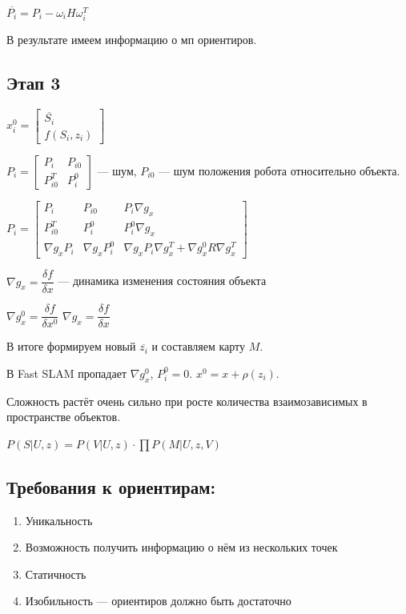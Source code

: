 \documentclass[12pt]{article}
\begin{document}
$\overline{P_i} = P_i - \omega_i H \omega_i^T$

В результате имеем информацию о мп ориентиров.

\subsection{Этап 3}

$x_i^0 = \begin{bmatrix} \overline{S_i} \\ f(S_i, z_i) \end{bmatrix}$

$P_i = \begin{bmatrix}P_i & P_{i0} \\ P_{i0}^T & P_i^0\end{bmatrix}$ — шум, $P_{i0}$ — шум положения робота относительно объекта.

$P_i = \begin{bmatrix}
        P_i            & P_{i0}           & P_i \nabla g_x                                            \\
        P_{i0}^T       & P_i^0            & P_i^0 \nabla g_x                                          \\
        \nabla g_x P_i & \nabla g_x P_i^0 & \nabla g_x P_i \nabla g_x^T + \nabla g_x^0 R \nabla g_x^T
    \end{bmatrix}$

$\nabla g_x = \dfrac{\delta f}{\delta x}$ — динамика изменения состояния объекта

$\nabla g_x^0 = \dfrac{\delta f}{\delta x^0}$
$\nabla g_x = \dfrac{\delta f}{\delta x}$

В итоге формируем новый $\overline{z_i}$ и составляем карту $M$.

В Fast SLAM пропадает $\nabla g_x^0$, $P_i^0 = 0$. $x^0 = x + \rho(z_i)$.

Сложность растёт очень сильно при росте количества взаимозависимых в пространстве объектов.

$P(S|U,z) = P(V|U, z) \cdot \prod P(M | U,z,V)$

\subsection{Требования к ориентирам:}

\begin{enumerate}
    \item Уникальность
    \item Возможность получить информацию о нём из нескольких точек\
    \item Статичность
    \item Изобильность — ориентиров должно быть достаточно
\end{enumerate}
\end{document}
